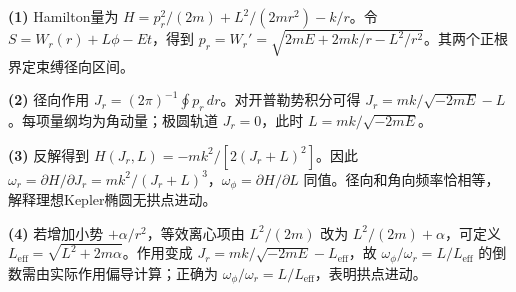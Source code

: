\par\noindent\textbf{(1)} Hamilton量为 \(H=p_r^2/(2m)+L^2/(2mr^2)-k/r\)。令 \(S=W_r(r)+L\phi-Et\)，得到 \(p_r=W_r'=\sqrt{2mE+2mk/r-L^2/r^2}\)。其两个正根界定束缚径向区间。
\par\noindent\textbf{(2)} 径向作用 \(J_r=(2\pi)^{-1}\oint p_r\,dr\)。对开普勒势积分可得 \(J_r=mk/\sqrt{-2mE}-L\)。每项量纲均为角动量；极圆轨道 \(J_r=0\)，此时 \(L=mk/\sqrt{-2mE}\)。
\par\noindent\textbf{(3)} 反解得到 \(H(J_r,L)=-mk^2/[2(J_r+L)^2]\)。因此 \(\omega_r=\partial H/\partial J_r=mk^2/(J_r+L)^3\)，\(\omega_\phi=\partial H/\partial L\) 同值。径向和角向频率恰相等，解释理想Kepler椭圆无拱点进动。
\par\noindent\textbf{(4)} 若增加小势 \(+\alpha/r^2\)，等效离心项由 \(L^2/(2m)\) 改为 \(L^2/(2m)+\alpha\)，可定义 \(L_{\mathrm{eff}}=\sqrt{L^2+2m\alpha}\)。作用变成 \(J_r=mk/\sqrt{-2mE}-L_{\mathrm{eff}}\)，故 \(\omega_\phi/\omega_r=L/L_{\mathrm{eff}}\) 的倒数需由实际作用偏导计算；正确为 \(\omega_\phi/\omega_r=L/L_{\mathrm{eff}}\)，表明拱点进动。
